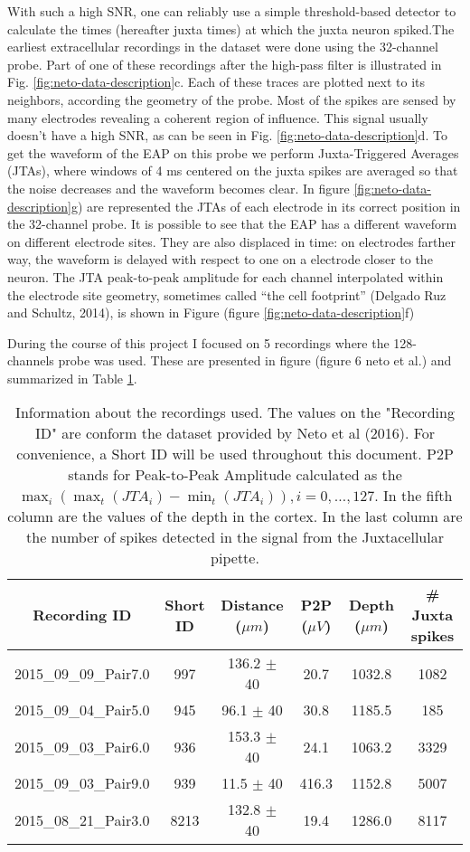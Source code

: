 \documentclass{report}
\begin{document}
With such a high SNR, one can reliably use a simple threshold-based detector to calculate the times (hereafter juxta times) at which the juxta neuron spiked.The earliest extracellular recordings in the dataset were done using the 32-channel probe. Part of one of these recordings after the high-pass filter is illustrated in Fig. \ref{fig:neto-data-description}c.  Each of these traces are plotted next to its neighbors, according the geometry of the probe. Most of the spikes are sensed by many electrodes revealing a coherent region of influence. This signal usually doesn't have a high SNR, as can be seen in Fig. \ref{fig:neto-data-description}d. To get the waveform of the EAP on this probe we perform Juxta-Triggered Averages (JTAs), where windows of 4 ms centered on the juxta spikes are averaged so that the noise decreases and the waveform becomes clear. In figure \ref{fig:neto-data-description}g) are represented the JTAs of each electrode in its correct position in the 32-channel probe. It is possible to see that the EAP has a different waveform on different electrode sites. They are also displaced in time: on electrodes farther way, the waveform is delayed with respect to one on a electrode closer to the neuron. The JTA peak-to-peak amplitude for each channel interpolated within the electrode site geometry, sometimes called “the cell footprint” (Delgado Ruz and Schultz, 2014), is shown in Figure (figure \ref{fig:neto-data-description}f)

During the course of this project I focused on 5 recordings where the 128-channels probe was used. These are presented in figure (figure 6 neto et al.) and summarized in Table \ref{tab:sum-recordings}.
\begin{table}[!h]
\centering
\begin{tabular}{|c|c|c|c|c|c|}
\hline
\textbf{Recording ID} & \textbf{Short ID} & \textbf{Distance ($\mu m$) } & \textbf{P2P ($\mu V$)} & \textbf{Depth ($\mu m$)} & \textbf{\# Juxta spikes}\\ \hline
2015\_09\_09\_Pair7.0 & 997 & 136.2 $\pm$ 40 & 20.7 & 1032.8 & 1082  \\ \hline
2015\_09\_04\_Pair5.0 & 945 & 96.1 $\pm$ 40 & 30.8 & 1185.5 & 185  \\ \hline
2015\_09\_03\_Pair6.0 & 936 & 153.3 $\pm$  40 & 24.1 & 1063.2 & 3329 \\ \hline
2015\_09\_03\_Pair9.0 & 939 & 11.5 $\pm$  40 & 416.3 & 1152.8 & 5007  \\ \hline
2015\_08\_21\_Pair3.0 & 8213 & 132.8 $\pm$ 40 & 19.4 & 1286.0 & 8117 \\ \hline
\end{tabular}
\caption{Information about the recordings used. The values on the "Recording ID" are conform the dataset provided by Neto et al (2016). For convenience, a Short ID will be used throughout this document. P2P stands for Peak-to-Peak Amplitude calculated as the $\max_i \left( \max_t \left( JTA_i \right) - \min_t \left( JTA_i \right)\right), i=0,\ldots , 127$. In the fifth column are the values of the depth in the cortex. In the last column are the number of spikes detected in the signal from the Juxtacellular pipette.}
\label{tab:sum-recordings}
\end{table}
\end{document}
